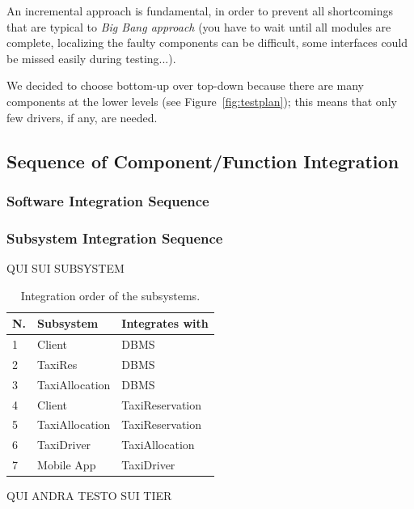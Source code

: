 \documentclass[a4paper, 12pt]{article}
\newcounter{tc}
\begin{document}
An incremental approach is fundamental, in order to prevent all shortcomings that are typical to \emph{Big Bang approach} (you have to wait until all modules are complete, localizing the faulty components can be difficult, some interfaces could be missed easily during testing...).

We decided to choose bottom-up over top-down because there are many components at the lower levels (see Figure~\ref{fig:testplan}); this means that only few drivers, if any, are needed.

\subsection{Sequence of Component/Function Integration}
\label{sub:sequence_of_component_function_integration}

\subsubsection{Software Integration Sequence}
\label{ssub:software_integration_sequence}


\subsubsection{Subsystem Integration Sequence}
\label{ssub:subsystem_integration_sequence}

QUI SUI SUBSYSTEM
\begin{table}
    \centering
    \begin{tabular}{| l | l | l |}
        \hline
        \textbf{N.} & \textbf{Subsystem} & \textbf{Integrates with} \\
        \hline
        1 & Client & DBMS \\
        2 & TaxiRes & DBMS \\
        3 & TaxiAllocation & DBMS \\
        4 & Client & TaxiReservation \\
        5 & TaxiAllocation & TaxiReservation \\
        6 & TaxiDriver & TaxiAllocation \\
        7 & Mobile App & TaxiDriver \\
        \hline
    \end{tabular}
    \caption{Integration order of the subsystems.}
    \label{tab:subsystem-integration}
\end{table}

QUI ANDRA TESTO SUI TIER
\end{document}
